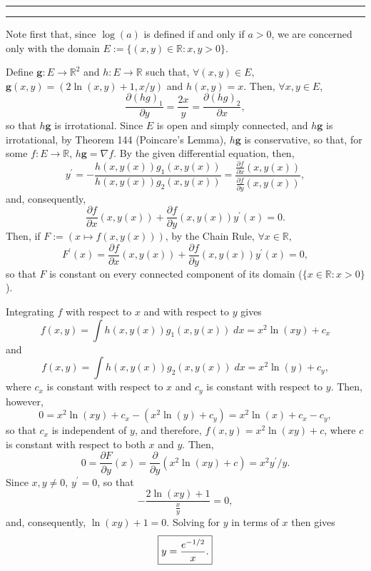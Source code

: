 \documentclass[11pt]{article}
\newcounter{questionCounter}
\newcounter{partCounter}[questionCounter]
\newenvironment{question}[2][\arabic{questionCounter}]{%
    \setcounter{partCounter}{0}%
    \vspace{.25in} \hrule \vspace{0.5em}%
        \noindent{\bf #2}%
    \vspace{0.8em} \hrule \vspace{.10in}%
    \addtocounter{questionCounter}{1}%
}{}
\begin{document}
\newpage
\begin{question}{Problem 4}
Note first that, since $\log(a)$ is defined if and only if $a > 0$, we are
concerned only with the domain $E := \{(x,y) \in \mathbb{R} : x,y > 0\}$.

Define $\mathbf{g}: E \rightarrow \mathbb{R}^2$ and
$h: E \rightarrow \mathbb{R}$ such that,
$\forall (x,y) \in E$, $\mathbf{g}(x,y) = (2 \ln(x,y) + 1, x/y)$ and
$h(x,y) = x$. Then, $\forall x,y \in E$,
\[\frac{\partial (hg)_1}{\partial y}
    = \frac{2x}{y}
    = \frac{\partial (hg)_2}{\partial x},\]
so that $h\mathbf{g}$ is irrotational. Since $E$ is open and simply connected,
and $h\mathbf{g}$ is irrotational, by Theorem 144 (Poincare's Lemma),
$h\mathbf{g}$ is conservative, so that, for some $f: E \rightarrow \mathbb{R}$,
$h\mathbf{g} = \nabla f$. By the given differential equation, then,
\[y^{\prime}
 = - \frac{h(x,y(x))g_1(x,y(x))}{h(x,y(x))g_2(x,y(x))}
 = \frac{\frac{\partial f}{\partial x}(x,y(x))}{\frac{\partial f}{\partial y}(x,y(x))},
\]
and, consequently,
\[\frac{\partial f}{\partial x}(x,y(x))
    + \frac{\partial f}{\partial y}(x,y(x))y^{\prime}(x) = 0.\]
Then, if $F := (x \mapsto f(x,y(x)))$, by the Chain
Rule, $\forall x \in \mathbb{R}$,
\[F^{\prime}(x) = \frac{\partial f}{\partial x}(x,y(x))
    + \frac{\partial f}{\partial y}(x,y(x))y^{\prime}(x) = 0,\] so that $F$ is
constant on every connected component of its domain
($\{x \in \mathbb{R} : x > 0\}$).

Integrating $f$ with respect to $x$ and with respect to $y$ gives
\[f(x,y) = \int h(x,y(x))g_1(x,y(x)) \; dx = x^2 \ln(xy) + c_x\]
and
\[f(x,y) = \int h(x,y(x))g_2(x,y(x)) \; dx = x^2 \ln(y) + c_y,\]
where $c_x$ is constant with respect to $x$ and $c_y$ is constant with respect
to $y$. Then, however,
\[0 = x^2 \ln(xy) + c_x - (x^2 \ln(y) + c_y) = x^2\ln(x) + c_x - c_y,\] so that
$c_x$ is independent of $y$, and therefore, $f(x,y) = x^2 \ln(xy) + c$, where
$c$ is constant with respect to both $x$ and $y$. Then,
\[0 = \frac{\partial F}{\partial y}(x)
         = \frac{\partial}{\partial y}(x^2 \ln(xy) + c) = x^2y^{\prime}/y.\]
Since $x,y \neq 0$, $y^{\prime} = 0$, so that
\[-\frac{2 \ln(xy) + 1}{\frac{x}{y}} = 0,\] and, consequently,
$\ln(xy) + 1 = 0$. Solving for $y$ in terms of $x$ then gives
\[\mbox{\fbox{$\displaystyle y = \frac{e^{-1/2}}{x}$.}}\]
\end{question}
\end{document}
